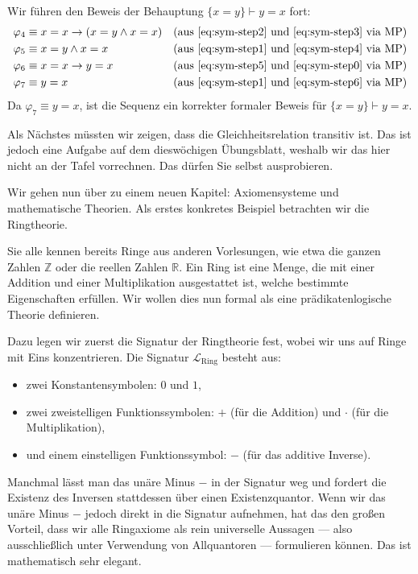 \begin{math-stroke}
Wir führen den Beweis der Behauptung $\{x = y\} \vdash y = x$ fort:
\begin{align}
\varphi_4 &\equiv x = x \rightarrow (x = y \wedge x = x) && \text{(aus \ref{eq:sym-step2} und \ref{eq:sym-step3} via $\text{MP}$)} \label{eq:sym-step4} \\
\varphi_5 &\equiv x = y \wedge x = x && \text{(aus \ref{eq:sym-step1} und \ref{eq:sym-step4} via $\text{MP}$)} \label{eq:sym-step5} \\
\varphi_6 &\equiv x = x \rightarrow y = x && \text{(aus \ref{eq:sym-step5} und \ref{eq:sym-step0} via $\text{MP}$)} \label{eq:sym-step6} \\
\varphi_7 &\equiv y = x && \text{(aus \ref{eq:sym-step1} und \ref{eq:sym-step6} via $\text{MP}$)} \label{eq:sym-step7}
\end{align}
Da $\varphi_7 \equiv y = x$, ist die Sequenz ein korrekter formaler Beweis für $\{x = y\} \vdash y = x$.
\end{math-stroke}

\begin{spoken-clean}[01:02:27 - 01:03:42]
Als Nächstes müssten wir zeigen, dass die Gleichheitsrelation transitiv ist. Das ist jedoch eine Aufgabe auf dem dieswöchigen Übungsblatt, weshalb wir das hier nicht an der Tafel vorrechnen. Das dürfen Sie selbst ausprobieren. 

Wir gehen nun über zu einem neuen Kapitel: Axiomensysteme und mathematische Theorien. Als erstes konkretes Beispiel betrachten wir die Ringtheorie. 

Sie alle kennen bereits Ringe aus anderen Vorlesungen, wie etwa die ganzen Zahlen $\mathbb{Z}$ oder die reellen Zahlen $\mathbb{R}$. Ein Ring ist eine Menge, die mit einer Addition und einer Multiplikation ausgestattet ist, welche bestimmte Eigenschaften erfüllen. Wir wollen dies nun formal als eine prädikatenlogische Theorie definieren. 

Dazu legen wir zuerst die Signatur der Ringtheorie fest, wobei wir uns auf Ringe mit Eins konzentrieren. Die Signatur $\mathcal{L}_{\text{Ring}}$ besteht aus:
\begin{itemize}
    \item zwei Konstantensymbolen: $0$ und $1$,
    \item zwei zweistelligen Funktionssymbolen: $+$ (für die Addition) und $\cdot$ (für die Multiplikation),
    \item und einem einstelligen Funktionssymbol: $-$ (für das additive Inverse).
\end{itemize}

Manchmal lässt man das unäre Minus $-$ in der Signatur weg und fordert die Existenz des Inversen stattdessen über einen Existenzquantor. Wenn wir das unäre Minus $-$ jedoch direkt in die Signatur aufnehmen, hat das den großen Vorteil, dass wir alle Ringaxiome als rein universelle Aussagen --- also ausschließlich unter Verwendung von Allquantoren --- formulieren können. Das ist mathematisch sehr elegant.
\end{spoken-clean}

